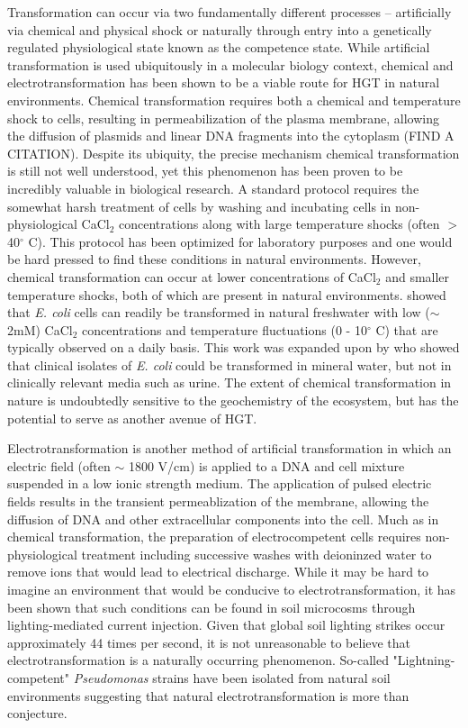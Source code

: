 Transformation can occur via two fundamentally different processes --
artificially via chemical and physical shock or naturally through entry into a
genetically regulated physiological state known as the competence state. While
artificial transformation is used ubiquitously in a molecular biology context,
chemical and electrotransformation has been shown to be a viable route for HGT
in natural environments. Chemical transformation requires both a chemical and
temperature shock to cells, resulting in permeabilization of the plasma
membrane, allowing the diffusion of plasmids and linear DNA fragments into the
cytoplasm (FIND A CITATION). Despite its ubiquity, the precise mechanism
chemical transformation is still not well understood, yet this phenomenon has been 
proven to be incredibly valuable in  biological research.  A standard protocol
requires the somewhat harsh treatment of cells by washing and incubating cells
in non-physiological CaCl$_2$ concentrations along with large temperature shocks
(often $>$ 40$^\circ$ C). This protocol has been optimized for laboratory
purposes and one would be hard pressed to find these conditions in natural
environments.  However, chemical transformation can occur at lower
concentrations of CaCl$_2$ and smaller temperature shocks, both of which are
present in natural environments. \citet{Baur:2006ba} showed that \textit{E.
coli} cells can readily be transformed in natural freshwater with low
($\sim$2mM) CaCl$_2$ concentrations and temperature fluctuations (0 - 10$^\circ$
C) that are typically observed on a daily basis. This work was expanded upon by
\citet{Woegerbauer:2002ev} who showed that clinical isolates of \textit{E. coli}
could be transformed in mineral water, but not in clinically relevant media such
as urine. The extent of chemical transformation in nature is undoubtedly
sensitive to the geochemistry of the ecosystem, but has the potential to serve
as another avenue of HGT.

Electrotransformation is another method of artificial transformation in which
an  electric field (often $\sim$ 1800 V/cm) is applied to a DNA
and cell mixture suspended in a low ionic strength medium. The application of
pulsed electric fields results in the transient permeablization of the membrane,
allowing the diffusion of DNA and other extracellular components into the
cell\cite{Wegner:2015fx}. Much as in chemical
transformation, the preparation of electrocompetent cells requires
non-physiological treatment including successive washes with deioninzed water to
remove ions that would lead to electrical discharge. While it may be hard to
imagine an environment that would be conducive to electrotransformation, it has
been shown that such conditions can be found in soil microcosms through
lighting-mediated current injection\cite{Demaneche:2001kb}. Given that
global soil lighting strikes occur approximately 44 times per
second\cite{NOAAlighting}, it is not unreasonable to believe that
electrotransformation is a naturally occurring phenomenon. So-called
"Lightning-competent" \textit{Pseudomonas} strains have been isolated from
natural soil environments \cite{Ceremonie:2004gr} suggesting that natural
electrotransformation is more than conjecture.


